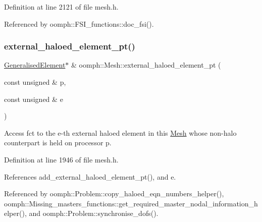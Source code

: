 Definition at line 2121 of file mesh.\+h.



Referenced by oomph\+::\+F\+S\+I\+\_\+functions\+::doc\+\_\+fsi().

\mbox{\label{classoomph_1_1Mesh_a98da056d3db6f770e29d3739b6711eae}} 
\subsubsection{\texorpdfstring{external\+\_\+haloed\+\_\+element\+\_\+pt()}{external\_haloed\_element\_pt()}}
{\footnotesize\ttfamily \hyperlink{classoomph_1_1GeneralisedElement}{Generalised\+Element}$\ast$ \& oomph\+::\+Mesh\+::external\+\_\+haloed\+\_\+element\+\_\+pt (\begin{DoxyParamCaption}\item[{const unsigned \&}]{p,  }\item[{const unsigned \&}]{e }\end{DoxyParamCaption})\hspace{0.3cm}{\ttfamily [inline]}}



Access fct to the e-\/th external haloed element in this \hyperlink{classoomph_1_1Mesh}{Mesh} whose non-\/halo counterpart is held on processor p. 



Definition at line 1946 of file mesh.\+h.



References add\+\_\+external\+\_\+haloed\+\_\+element\+\_\+pt(), and e.



Referenced by oomph\+::\+Problem\+::copy\+\_\+haloed\+\_\+eqn\+\_\+numbers\+\_\+helper(), oomph\+::\+Missing\+\_\+masters\+\_\+functions\+::get\+\_\+required\+\_\+master\+\_\+nodal\+\_\+information\+\_\+helper(), and oomph\+::\+Problem\+::synchronise\+\_\+dofs().

\mbox{\label{classoomph_1_1Mesh_a438252c1785f8beea0c0ad4cbeb33e37}} 
